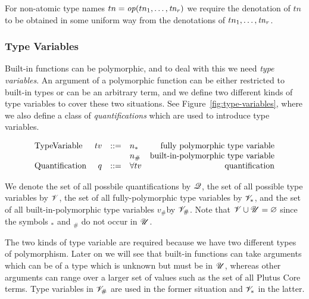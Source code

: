 For non-atomic type names $tn = \mathit{op}(tn_1, \ldots, \mathit{tn}_r)$ we require the
denotation of $tn$ to be obtained in some uniform way from the denotations of
$tn_1, \ldots, \mathit{tn}_r$.  

\subsubsection{Type Variables}
Built-in functions can be polymorphic, and to deal with this we need
\textit{type variables}.  An argument of a polymorphic function can be either
restricted to built-in types or can be an arbitrary term, and we define two
different kinds of type variables to cover these two situations.  See
Figure~\ref{fig:type-variables}, where we also define a class of
\textit{quantifications} which are used to introduce type variables.

\begin{minipage}{\linewidth}
  \centering
      \[\begin{array}{lrclr}
        \textrm{TypeVariable}    & tv      & ::= & n_{*} & \textrm{fully polymorphic type variable}\\
                                 &         &     & n_{\#} & \textrm{built-in-polymorphic type variable}\\
        \textrm{Quantification}  & q       & ::= & \mathbf{\forall}tv & \textrm{quantification}\\
        
    \end{array}\]
    \label{fig:type-variables}
\end{minipage}

\medskip
\noindent
We denote the set of all possbile quantifications by $\mathscr{Q}$, the set of all
possible type variables by $\mathscr{V}$, the set of all fully-polymorphic type
variables by $\mathscr{V}_*$, and the set of all built-in-polymorphic type variables
$v_\#$by $\mathscr{V}_\#$.  Note that $\mathscr{V} \cup \mathscr{U} = \varnothing$ since the symbols
${}_*$ and ${}_\#$ do not occur in $\mathscr{U}$.

The two kinds of type variable are required because we have two different types
of polymorphism. Later on we will see that built-in functions can take arguments
which can be of a type which is unknown but must be in $\mathscr{U}$, whereas other
arguments can range over a larger set of values such as the set of all Plutus
Core terms. Type variables in $\mathscr{V}_\#$ are used in the former situation
and $\mathscr{V}_*$ in the latter.

